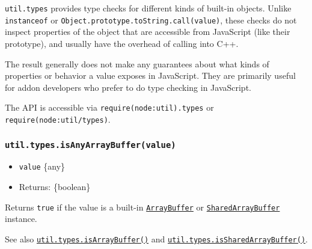 \texttt{util.types} provides type checks for different kinds of built-in
objects. Unlike \texttt{instanceof} or
\texttt{Object.prototype.toString.call(value)}, these checks do not
inspect properties of the object that are accessible from JavaScript
(like their prototype), and usually have the overhead of calling into
C++.

The result generally does not make any guarantees about what kinds of
properties or behavior a value exposes in JavaScript. They are primarily
useful for addon developers who prefer to do type checking in
JavaScript.

The API is accessible via
\texttt{require(\textquotesingle{}node:util\textquotesingle{}).types} or
\texttt{require(\textquotesingle{}node:util/types\textquotesingle{})}.

\subsubsection{\texorpdfstring{\texttt{util.types.isAnyArrayBuffer(value)}}{util.types.isAnyArrayBuffer(value)}}\label{util.types.isanyarraybuffervalue}

\begin{itemize}
\tightlist
\item
  \texttt{value} \{any\}
\item
  Returns: \{boolean\}
\end{itemize}

Returns \texttt{true} if the value is a built-in
\href{https://developer.mozilla.org/en-US/docs/Web/JavaScript/Reference/Global_Objects/ArrayBuffer}{\texttt{ArrayBuffer}}
or
\href{https://developer.mozilla.org/en-US/docs/Web/JavaScript/Reference/Global_Objects/SharedArrayBuffer}{\texttt{SharedArrayBuffer}}
instance.

See also
\hyperref[utiltypesisarraybuffervalue]{\texttt{util.types.isArrayBuffer()}}
and
\hyperref[utiltypesissharedarraybuffervalue]{\texttt{util.types.isSharedArrayBuffer()}}.

\begin{Shaded}
\begin{Highlighting}[]
\NormalTok{(} \NormalTok{())}\OperatorTok{;}  
\NormalTok{(} \NormalTok{())}\OperatorTok{;}  
\end{Highlighting}
\end{Shaded}

